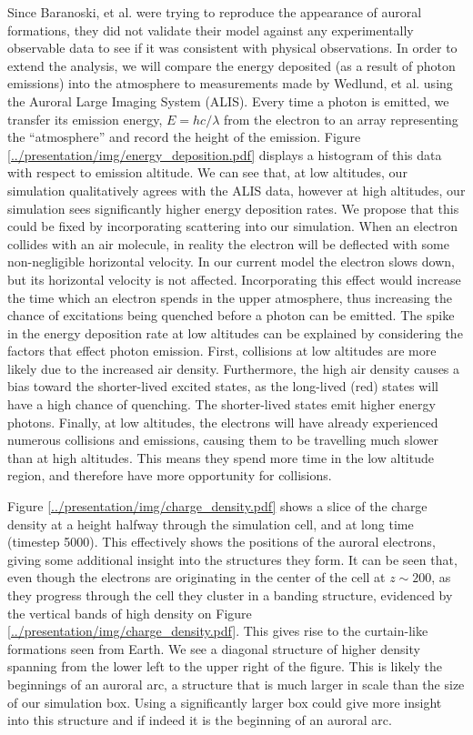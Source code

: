 \documentclass[twocolumn]{article}
\begin{document}
Since Baranoski, et al. were trying to reproduce the appearance of auroral formations, they did not validate their model against any experimentally observable data to see if it was consistent with physical observations.  In order to extend the analysis, we will compare the energy deposited (as a result of photon emissions) into the atmosphere to measurements made by Wedlund, et al. \cite{Wedlund2013} using the Auroral Large Imaging System (ALIS).  Every time a photon is emitted, we transfer its emission energy, $E = hc/\lambda$ from the electron to an array representing the ``atmosphere'' and record the height of the emission.  Figure \ref{../presentation/img/energy_deposition.pdf} displays a histogram of this data with respect to emission altitude.  We can see that, at low altitudes, our simulation qualitatively agrees with the ALIS data, however at high altitudes, our simulation sees significantly higher energy deposition rates.  We propose that this could be fixed by incorporating scattering into our simulation.  When an electron collides with an air molecule, in reality the electron will be deflected with some non-negligible horizontal velocity.  In our current model the electron slows down, but its horizontal velocity is not affected. Incorporating this effect would increase the time which an electron spends in the upper atmosphere, thus increasing the chance of excitations being quenched before a photon can be emitted.
The spike in the energy deposition rate at low altitudes can be explained by considering the factors that effect photon emission. First, collisions at low altitudes are more likely due to the increased air density.  Furthermore, the high air density causes a bias toward the shorter-lived excited states, as the long-lived (red) states will have a high chance of quenching. The shorter-lived states emit higher energy photons.  Finally, at low altitudes, the electrons will have already experienced numerous collisions and emissions, causing them to be travelling much slower than at high altitudes. This means they spend more time in the low altitude region, and therefore have more opportunity for collisions.

Figure \ref{../presentation/img/charge_density.pdf} shows a slice of the charge density at a height halfway through the simulation cell, and at long time (timestep 5000).   This effectively shows the positions of the auroral electrons, giving some additional insight into the structures they form. It can be seen that, even though the electrons are originating in the center of the cell at $z\sim 200$, as they progress through the cell they cluster in a banding structure, evidenced by the vertical bands of high density on Figure \ref{../presentation/img/charge_density.pdf}.  This gives rise to the curtain-like formations seen from Earth.  We see a diagonal structure of higher density spanning from the lower left to the upper right of the figure.  This is likely the beginnings of an auroral arc, a structure that is much larger in scale than the size of our simulation box.  Using a significantly larger box could give more insight into this structure and if indeed it is the beginning of an auroral arc.
\end{document}

